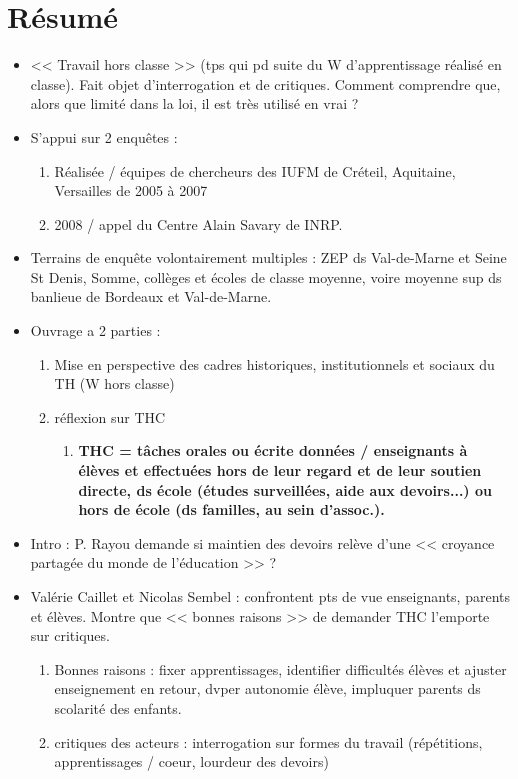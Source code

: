 \documentclass[12pt]{article}
\begin{document}
\section*{Résumé}
\begin{itemize}[label=]
\item << Travail hors classe >> (tps qui pd suite du W d'apprentissage réalisé en classe). Fait objet d'interrogation et de critiques. Comment comprendre que, alors que limité dans la loi, il est très utilisé en vrai ? \\

\item S'appui sur 2 enquêtes : 
\begin{enumerate}
\item Réalisée / équipes de chercheurs des IUFM de Créteil, Aquitaine, Versailles de 2005 à 2007
\item 2008 / appel du Centre Alain Savary de INRP.\\
\end{enumerate}


\item Terrains de enquête volontairement multiples : ZEP ds Val-de-Marne et Seine St Denis, Somme, collèges et écoles de classe moyenne, voire moyenne sup ds banlieue de Bordeaux et Val-de-Marne. \\


\item Ouvrage a 2 parties : 
\begin{enumerate}
\item Mise en perspective des cadres historiques, institutionnels et sociaux du TH (W hors classe)
\item réflexion sur THC 
\begin{enumerate}
 \item \textbf{THC = tâches orales ou écrite données / enseignants à élèves et effectuées hors de leur regard et de leur soutien directe, ds école (études surveillées, aide aux devoirs...) ou hors de école (ds familles, au sein d'assoc.). }
\end{enumerate}
\end{enumerate}

\item Intro : P. Rayou demande si maintien des devoirs relève d'une << croyance partagée du monde de l'éducation >> ?\\

\item Valérie Caillet et Nicolas Sembel : confrontent pts de vue enseignants, parents et élèves. Montre que << bonnes raisons >> de demander THC l'emporte sur critiques.
\begin{enumerate}
\item Bonnes raisons : fixer apprentissages, identifier difficultés élèves et ajuster enseignement en retour, dvper autonomie élève, impluquer parents ds scolarité des enfants. \\
\item critiques des acteurs : interrogation sur formes du travail (répétitions, apprentissages / coeur, lourdeur des devoirs)
\end{enumerate}



\end{itemize}
\end{document}
